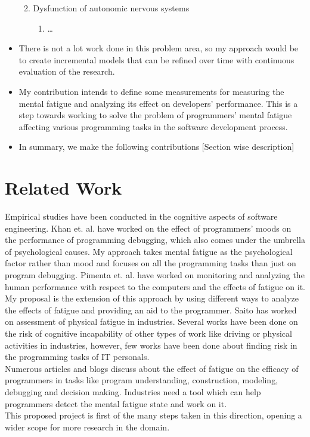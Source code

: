 \documentclass{acm_proc_article-sp}
\begin{document}
\begin{itemize}
\begin{enumerate}
\begin{enumerate}
   		\end{enumerate}
   		\item Dysfunction of autonomic nervous systems
   		\begin{enumerate}
   		  \item \ldots
   		\end{enumerate}
  \end{enumerate}
  \item There is not a lot work done in this problem area, so my approach would be to
create incremental models that can be refined over time with continuous evaluation 
of the research. 
  \item My contribution intends to define some measurements for measuring the
  mental fatigue and analyzing its effect on developers' performance. This is a
  step towards working to solve the problem of programmers' mental fatigue
  affecting various programming tasks in the software development process.
  \item In summary, we make the following contributions [Section wise
  description]
\end{itemize}

\section{Related Work}
Empirical studies have been conducted in the cognitive aspects 
of software engineering. Khan et. al. \cite{khan:mood} have worked on the effect 
of programmers' moods on the performance of programming debugging, 
which also comes under the umbrella of psychological causes. 
My approach takes mental fatigue as the psychological factor 
rather than mood and focuses on all the programming tasks than just 
on program debugging. Pimenta et. al.
\cite{pimenta:monitor} \cite{pimenta:analysis} have worked on monitoring and
analyzing the human performance with respect to the computers and the effects 
of fatigue on it. My proposal is the extension of 
this approach by using different ways to analyze the effects of 
fatigue and providing an aid to the programmer. Saito \cite{saito:industry} has worked 
on assessment of physical fatigue in industries. Several works 
have been done on the risk of cognitive incapability of other 
types of work like driving or physical activities in industries, 
however, few works have been done about finding risk in the programming 
tasks of IT personals.\\
Numerous articles and blogs discuss about the effect of fatigue 
on the efficacy of programmers in tasks like program understanding, 
construction, modeling, debugging and decision making. 
Industries need a tool which can help programmers detect the mental 
fatigue state and work on it.\\
This proposed project is first of the many steps taken in this 
direction, opening a wider scope for more research in the domain.
\end{document}
